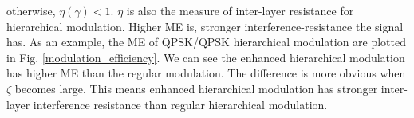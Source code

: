 \documentclass[10pt,fleqn, twocolumn]{IEEEtran}
\begin{document}
otherwise, $\eta\left(\gamma\right)<1$. $\eta$ is also the measure
of inter-layer resistance for hierarchical modulation. Higher ME
is, stronger interference-resistance the signal has. As an
example, the ME of QPSK/QPSK hierarchical modulation are plotted
in Fig. \ref{modulation_efficiency}. We can see the enhanced
hierarchical modulation has higher ME than the regular modulation.
The difference is more obvious when $\zeta$ becomes large. This
means enhanced hierarchical modulation has stronger inter-layer
interference resistance than regular hierarchical modulation.
\begin{figure}
\end{figure}
\end{document}
